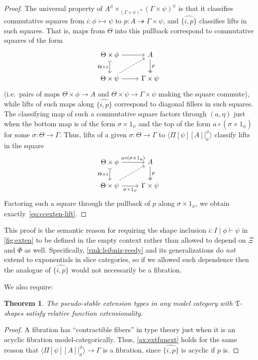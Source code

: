 \documentclass{amsart}
\theoremstyle{plain}
\newtheorem{thm}{Theorem}[section]
\theoremstyle{definition}
\theoremstyle{remark}
\numberwithin{equation}{section}
\newcommand{\ccexten}[4]{\langle\Pi[#1][#2] |^{#3}_{#4}\rangle}
\newcommand{\types}{\vdash}
\newcommand{\fT}{\mathfrak{T}}
\begin{document}
\begin{proof}
The universal property of ${A^\phi \times_{(\Gamma \times \psi)^{\phi}} (\Gamma \times \psi)^\psi}$ is that it classifies commutative squares from $i \colon \phi \rightarrowtail\psi$ to $p \colon A \twoheadrightarrow \Gamma \times \psi$, and $\widehat{\{i,p\}}$ classifies lifts in such squares.
That is, maps from $\Theta$ into this pullback correspond to commutative squares of the form
\[
\begin{tikzcd}
  {\Theta \times \phi} \arrow[d, tail, "{\Theta \times i}"'] \arrow[r] & A \arrow[d, two heads, "p"] \\ {\Theta \times \psi} \arrow[r] \ar[ur,dashed] & {\Gamma \times \psi}
\end{tikzcd}
\]
(i.e.\ pairs of maps $\Theta\times\phi\to A$ and $\Theta\times\psi\to\Gamma\times\psi$ making the square commute), while lifts of such maps along $\widehat{\{i,p\}}$ correspond to diagonal fillers in such squares.
The classifying map of such a commutative square factors through $(a, \eta)$ just when the bottom map is of the form $\sigma\times 1_\psi$ and the top of the form $a\circ (\sigma\times 1_\phi)$ for some $\sigma:\Theta\to\Gamma$.
Thus, lifts of a given $\sigma:\Theta\to\Gamma$ to $\ccexten{\psi}{A}{\phi}{a}$ classify lifts in the square
\[
\begin{tikzcd} {\Theta \times \phi} \arrow[d, tail, "{\Theta \times i}"'] \arrow[r, "a\circ (\sigma\times 1_\phi)"] & A \arrow[d, two heads, "p"] \\ {\Theta \times \psi} \arrow[r, "\sigma\times 1_\psi"'] \arrow[ur, dashed] & {\Gamma \times \psi}
\end{tikzcd}
\]
Factoring such a square through the pullback of $p$ along $\sigma\times 1_\psi$, we obtain exactly~\eqref{eq:ccexten-lift}.
\end{proof}

This proof is the semantic reason for requiring the shape inclusion $i:I \mid \phi\types\psi$ in \cref{fig:exten} to be defined in the empty context rather than allowed to depend on $\Xi$ and $\Phi$ as well.
Specifically, \cref{rmk:leibniz-reedy} and its generalizations do \emph{not} extend to exponentials in slice categories, so if we allowed such dependence then the analogue of $\widehat{\{i,p\}}$ would not necessarily be a fibration.

We also require:

\begin{thm}
  The pseudo-stable extension types in any model category with $\fT$-shapes satisfy relative function extensionality.
\end{thm}
\begin{proof}
  A fibration has ``contractible fibers'' in type theory just when it is an acyclic fibration model-categorically.
  Thus, \cref{ax:extfunext} holds for the same reason that $\ccexten{\psi}{A}{\phi}{a}\to\Gamma$ is a fibration, since $\widehat{\{i,p\}}$ is acyclic if $p$ is.
\end{proof}
\end{document}
